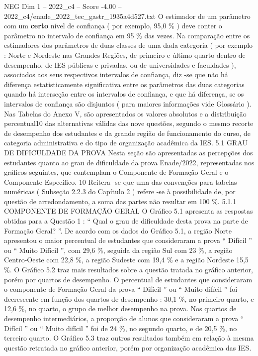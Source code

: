 \begin{textsample}{NEG Dim 1 – 2022\_c4 – Score -4.00 – 2022\_c4/enade\_2022\_tec\_gastr\_1935a4d527.txt}
O estimador de um parâmetro com um \textbf{certo} nível de confiança ( por exemplo, 95,0 \% ) deve conter o parâmetro no intervalo de confiança em 95 \% das vezes.
Na comparação entre os estimadores dos parâmetros de duas classes de uma dada categoria ( por exemplo : Norte e Nordeste nas Grandes Regiões, de primeiro e último quarto dentro de desempenho, de IES públicas e privadas, ou de universidades e faculdades ), associados aos seus respectivos intervalos de confiança, diz -se que não há diferença estatisticamente significativa entre os parâmetros das duas categorias quando há interseção entre os intervalos de confiança, e que há diferença, se os intervalos de confiança são disjuntos ( para maiores informações vide Glossário ).
Nas Tabelas do Anexo V, são apresentados os valores absolutos e a distribuição percentual10 das alternativas válidas das nove questões, segundo o mesmo recorte de desempenho dos estudantes e da grande região de funcionamento do curso, de categoria administrativa e do tipo de organização acadêmica da IES. 5.1 GRAU DE DIFICULDADE DA PROVA Nesta seção são apresentadas as percepções dos estudantes quanto ao grau de dificuldade da prova Enade/2022, representadas nos gráficos seguintes, que contemplam o Componente de Formação Geral e o Componente Específico. 10 Reitera -se que uma das convenções para tabelas numéricas ( Subseção 2.2.3 do Capítulo 2 ) refere -se à possibilidade de, por questão de arredondamento, a soma das partes não resultar em 100 \%. 5.1.1 COMPONENTE DE FORMAÇÃO GERAL O Gráfico 5.1 apresenta as respostas obtidas para a Questão 1 : “ Qual o grau de dificuldade desta prova na parte de Formação Geral? ”.
De acordo com os dados do Gráfico 5.1, a região Norte apresentou o maior percentual de estudantes que consideraram a prova “ Difícil ” ou “ Muito Difícil ”, com 29,6 \%, seguida da região Sul com 23 \%, a região Centro-Oeste com 22,8 \%, a região Sudeste com 19,4 \% e a região Nordeste 15,5 \%.
O Gráfico 5.2 traz mais resultados sobre a questão tratada no gráfico anterior, porém por quartos de desempenho.
O percentual de estudantes que consideraram o componente de Formação Geral da prova “ Difícil ” ou “ Muito difícil ” foi decrescente em função dos quartos de desempenho : 30,1 \%, no primeiro quarto, e 12,6 \%, no quarto, o grupo de melhor desempenho na prova.
Nos quartos de desempenho intermediários, a proporção de alunos que consideraram a prova “ Difícil ” ou “ Muito difícil ” foi de 24 \%, no segundo quarto, e de 20,5 \%, no terceiro quarto.
O Gráfico 5.3 traz outros resultados também em relação à mesma questão retratada no gráfico anterior, porém por organização acadêmica das IES.

\end{textsample}

